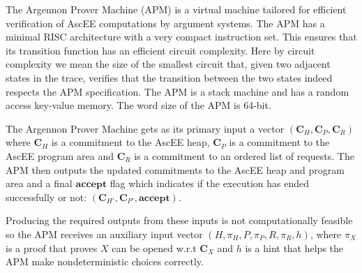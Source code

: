 
The Argennon Prover Machine (APM) is a virtual machine tailored for efficient verification of AscEE computations by
argument systems. The APM has a minimal RISC architecture with a very compact instruction set. This ensures that
its transition function has an efficient circuit complexity. Here by circuit complexity we mean the size
of the smallest circuit that, given two adjacent states in the trace, verifies that the transition between the two
states indeed respects the APM specification. The APM is a stack machine and has a random access key-value memory.
The word size of the APM is 64-bit.

The Argennon Prover Machine gets as its primary input a vector $(\mathbf{C}_H,\mathbf{C}_P,\mathbf{C}_R)$ where
$\mathbf{C}_H$ is a commitment to the AscEE heap, $\mathbf{C}_P$ is a commitment to the AscEE program area and
$\mathbf{C}_R$ is a commitment to an ordered list of requests. The APM then outputs the updated
commitments to the AscEE heap and program area and a final $\mathbf{accept}$ flag which indicates if the execution has
ended successfully or not: $(\mathbf{C}_{H'},\mathbf{C}_{P'},\mathbf{accept})$.

Producing the required outputs from these inputs is not computationally feasible so the APM receives an auxiliary
input vector $(H,\pi_H,P,\pi_P,R,\pi_R,h)$, where $\pi_X$ is a proof that proves $X$ can be opened w.r.t
$\mathbf{C}_X$ and $h$ is a hint that helps the APM make nondeterministic choices correctly.

